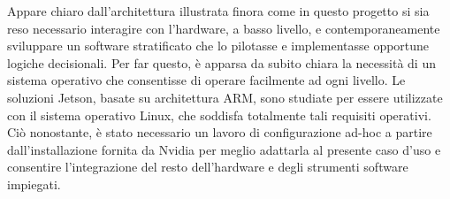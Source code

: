 \indent Appare chiaro dall'architettura illustrata finora come in questo progetto si sia reso necessario interagire con l'hardware, a basso livello, e contemporaneamente sviluppare un software stratificato che lo pilotasse e implementasse opportune logiche decisionali. Per far questo, è apparsa da subito chiara la necessità di un sistema operativo che consentisse di operare facilmente ad ogni livello. Le soluzioni Jetson, basate su architettura ARM, sono studiate per essere utilizzate con il sistema operativo Linux, che soddisfa totalmente tali requisiti operativi. Ciò nonostante, è stato necessario un lavoro di configurazione ad-hoc a partire dall'installazione fornita da Nvidia per meglio adattarla al presente caso d'uso e consentire l'integrazione del resto dell'hardware e degli strumenti software impiegati.\\
